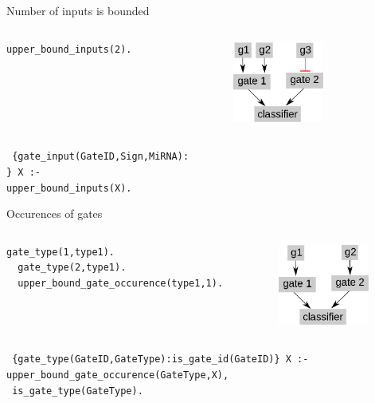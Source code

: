 \documentclass[10pt,dvipsnames]{beamer}
\begin{document}
\begin{frame}[fragile]{Number of inputs is bounded}
 \begin{columns}  
 \begin{column}{0.3\textwidth}
  \begin{Verbatim}[fontsize=\small]
  upper_bound_inputs(2).
 \end{Verbatim}
 \end{column}
 \begin{column}{0.5\textwidth}
 \begin{center}\includegraphics[width=3cm]{constraints_03.png}\end{center}
 \end{column}
 \end{columns}
 \vspace{2cm}
 \texttt{
  \{gate\_input(GateID,Sign,MiRNA):\\
   \} X :-\\
   \quad upper\_bound\_inputs(X).
 }
\end{frame}

\begin{frame}[fragile]{Occurences of gates}
 \begin{columns}  
 \begin{column}{0.5\textwidth}
  \begin{Verbatim}[fontsize=\small]
  gate_type(1,type1).
  gate_type(2,type1).
  upper_bound_gate_occurence(type1,1).
 \end{Verbatim}
 \end{column}
 \begin{column}{0.5\textwidth}
 \begin{center}\includegraphics[width=3cm]{constraints_04.png}\end{center}
 \end{column}
 \end{columns}
 \vspace{2cm}
 \texttt{
  \{gate\_type(GateID,GateType):{\color{gray}\;is\_gate\_id(GateID)}\} X :-\\
     \quad upper\_bound\_gate\_occurence(GateType,X),\\ {\color{gray}
     \quad is\_gate\_type(GateType)}.
 }
\end{frame}
 
\end{document}
